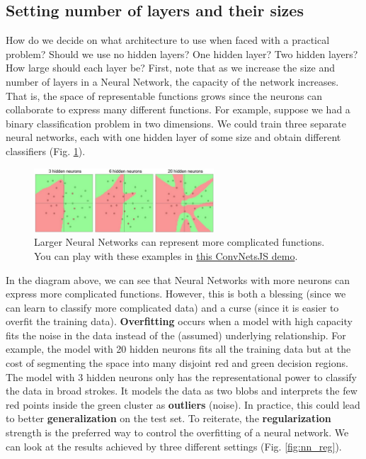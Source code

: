 \subsection*{Setting number of layers and their sizes}
How do we decide on what architecture to use when faced with a practical problem? Should we use no hidden layers? One hidden layer? Two hidden layers? How large should each layer be? First, note that as we increase the size and number of layers in a Neural Network, the capacity of the network increases. That is, the space of representable functions grows since the neurons can collaborate to express many different functions. For example, suppose we had a binary classification problem in two dimensions. We could train three separate neural networks, each with one hidden layer of some size and obtain different classifiers (Fig. \ref{fig:nn_classifiers}).

\begin{figure}[h]
  \centering
  \includegraphics[width=0.6\textwidth]{Images/nn/3.jpeg}
  \caption{Larger Neural Networks can represent more complicated functions. You can play with these examples in \href{http://cs.stanford.edu/people/karpathy/convnetjs/demo/classify2d.html}{this ConvNetsJS demo}.}
  \label{fig:nn_classifiers}
\end{figure}

In the diagram above, we can see that Neural Networks with more neurons can express more complicated functions. However, this is both a blessing (since we can learn to classify more complicated data) and a curse (since it is easier to overfit the training data). \textbf{Overfitting} occurs when a model with high capacity fits the noise in the data instead of the (assumed) underlying relationship. For example, the model with 20 hidden neurons fits all the training data but at the cost of segmenting the space into many disjoint red and green decision regions. The model with 3 hidden neurons only has the representational power to classify the data in broad strokes. It models the data as two blobs and interprets the few red points inside the green cluster as \textbf{outliers} (noise). In practice, this could lead to better \textbf{generalization} on the test set. To reiterate, the \textbf{regularization} strength is the preferred way to control the overfitting of a neural network. We can look at the results achieved by three different settings (Fig. \ref{fig:nn_reg}).

